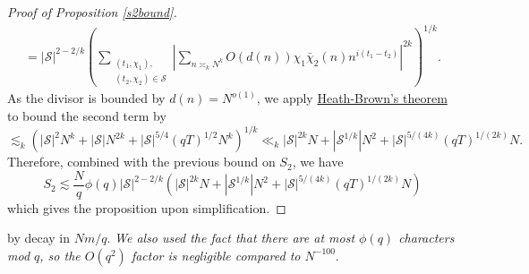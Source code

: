 \begin{proof}[Proof of Proposition \ref{s2bound}]
\begin{align*}
        =|\mathcal{S}|^{2-2/k}\left(\sum_{\substack{(t_1,\chi_1),\\(t_2,\chi_2)\in\mathcal{S}}} \left|\sum_{n\asymp_k N^k} O(d(n))\chi_1\bar\chi_2(n)n^{i(t_1-t_2)}\right|^{2k}\right)^{1/k}.
    \end{align*}
    As the divisor is bounded by $d(n)=N^{o(1)}$, we apply \hyperref[heathbrown]{Heath-Brown's theorem} to bound the second term by \[
    \lesssim_k (|\mathcal{S}|^2N^k+|\mathcal{S}|N^{2k}+|\mathcal{S}|^{5/4}(qT)^{1/2}N^k)^{1/k}\ll_k|\mathcal{S}|^{2k}N+|\mathcal{S}^{1/k}|N^{2}+|\mathcal{S}|^{5/(4k)}(qT)^{1/(2k)}N.
    \]
    Therefore, combined with the previous bound on $S_2$, we have \[
    S_2\lesssim \frac{N}{q} \phi(q)|\mathcal{S}|^{2-2/k}(|\mathcal{S}|^{2k}N+|\mathcal{S}^{1/k}|N^{2}+|\mathcal{S}|^{5/(4k)}(qT)^{1/(2k)}N)
    \]
    which gives the proposition upon simplification.
\end{proof}
\iffalse by decay in $Nm/q$. \textit{We also used the fact that there are at most $\phi(q)$ characters mod $q$, so the $O(q^2)$ factor is negligible compared to $N^{-100}$}.

